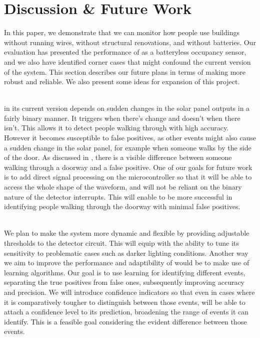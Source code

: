 \section{Discussion \& Future Work}
\label{sec:discussion}

In this paper, we demonstrate that we can monitor how people use buildings without running wires, without structural renovations, and without batteries.
Our evaluation has presented the performance of \sysname as a batteryless occupancy sensor, and we also have identified corner cases that might confound the current version of the system.
This section describes our future plans in terms of making \sysname more robust and reliable.
We also present some ideas for expansion of this project.

\\\sysname in its current version depends on sudden changes in the solar panel outputs in a fairly binary manner.
It triggers when there's change and doesn't when there isn't.
This allows it to detect people walking through with high accuracy.
However it becomes susceptible to false positives, as other events might also cause a sudden change in the solar panel, for example when someone walks by the side of the door.
As discussed in , there is a visible difference between someone walking through a doorway and a false positive.
One of our goals for future work is to add direct signal processing on the microcontroller so that it will be able to access the whole shape of the waveform, and will not be reliant on the binary nature of the detector interrupts.
This will enable \sysname to be more successful in identifying people walking through the doorway with minimal false positives.

\\We plan to make the system more dynamic and flexible by providing adjustable thresholds to the detector circuit.
This will equip \sysname with the ability to tune its sensitivity to problematic cases such as darker lighting conditions.
Another way we aim to improve the performance and adaptibility of \sysname would be to make use of learning algorithms.
Our goal is to use learning for identifying different events, separating the true positives from false ones, subsequently improving accuracy and precision.
We will introduce confidence indicators so that even in cases where it is comparatively tougher to distinguish between those events, \sysname will be able to attach a confidence level to its prediction, broadening the range of events it can identify.
This is a feasible goal considering the evident difference between those events.

